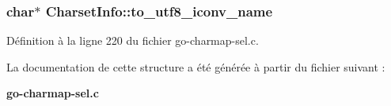 \subsubsection[{to\_\-utf8\_\-iconv\_\-name}]{\setlength{\rightskip}{0pt plus 5cm}char$\ast$ {\bf CharsetInfo::to\_\-utf8\_\-iconv\_\-name}}\label{structCharsetInfo_a19ba916ae24c200553e67035284fe06c}


Définition à la ligne 220 du fichier go-\/charmap-\/sel.c.



La documentation de cette structure a été générée à partir du fichier suivant :\begin{DoxyCompactItemize}
\item 
{\bf go-\/charmap-\/sel.c}\end{DoxyCompactItemize}
